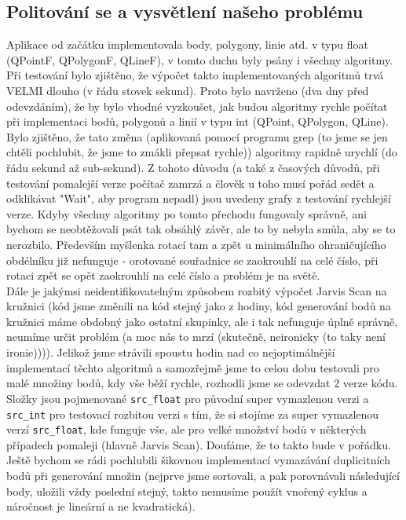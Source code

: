 \documentclass[a4paper, 12pt]{article}
\begin{document}
\subsection{Politování se a vysvětlení našeho problému}
Aplikace od začátku implementovala body, polygony, linie atd. v typu float (QPointF, QPolygonF, QLineF), v tomto duchu byly psány i všechny algoritmy. Při testování bylo zjištěno, že výpočet takto implementovaných algoritmů trvá VELMI dlouho (v řádu stovek sekund). Proto bylo navrženo (dva dny před odevzdáním), že by bylo vhodné vyzkoušet, jak budou algoritmy rychle počítat při implementaci bodů, polygonů a linií v typu int (QPoint, QPolygon, QLine). Bylo zjištěno, že tato změna (aplikovaná pomocí programu grep (to jsme se jen chtěli pochlubit, že jsme to zmákli přepsat rychle)) algoritmy rapidně urychlí (do řádu sekund až sub-sekund). Z tohoto důvodu (a také z časových důvodů, při testování pomalejší verze počítač zamrzá a člověk u toho musí pořád sedět a odklikávat "Wait", aby program nepadl) jsou uvedeny grafy z testování rychlejší verze. Kdyby všechny algoritmy po tomto přechodu fungovaly správně, ani bychom se neobtěžovali psát tak obsáhlý závěr, ale to by nebyla smůla, aby se to nerozbilo. Především myšlenka rotací tam a zpět u minimálního ohraničujícího obdélníku již nefunguje - orotované souřadnice se zaokrouhlí na celé číslo, při rotaci zpět se opět zaokrouhlí na celé číslo a problém je na světě. \\
Dále je jakýmsi neidentifikovatelným způsobem rozbitý výpočet Jarvis Scan na kružnici (kód jsme změnili na kód stejný jako z hodiny, kód generování bodů na kružnici máme obdobný jako ostatní skupinky, ale i tak nefunguje úplně správně, neumíme určit problém (a moc nás to mrzí (skutečně, neironicky (to taky není ironie)))). Jelikož jsme strávili spoustu hodin nad co nejoptimálnější implementací těchto algoritmů a samozřejmě jsme to celou dobu testovali pro malé množiny bodů, kdy vše běží rychle, rozhodli jsme se odevzdat 2 verze kódu. Složky jsou pojmenované \texttt{src\_float} pro původní super vymazlenou verzi a \texttt{src\_int} pro testovací rozbitou verzi s tím, že si stojíme za super vymazlenou verzí \texttt{src\_float}, kde funguje vše, ale pro velké množství bodů v některých případech pomaleji (hlavně Jarvis Scan). Doufáme, že to takto bude v pořádku.\\
 Ještě bychom se rádi pochlubili šikovnou implementací vymazávání duplicitních bodů při generování množin (nejprve jsme sortovali, a pak porovnávali následující body, uložili vždy poslední stejný, takto nemusíme použít vnořený cyklus a náročnost je lineární a ne kvadratická).
\end{document}
